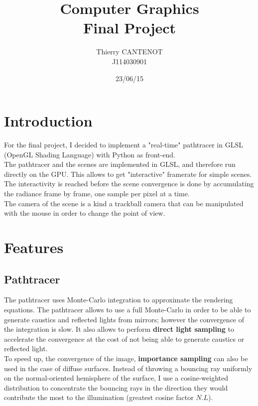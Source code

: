 \documentclass[a4paper,10pt]{article}
\title{\textbf{Computer Graphics} \\ Final Project}
\author{Thierry CANTENOT \\ J114030901}
\date{23/06/15}
\begin{document}
\maketitle


\pagebreak
\section{Introduction}

For the final project, I decided to implement a "real-time" pathtracer in GLSL (OpenGL Shading Language) with Python as front-end. \\
The pathtracer and the scenes are implemented in GLSL, and therefore run directly on the GPU. This allows to get "interactive" framerate for simple scenes. The interactivity is reached before the scene convergence is done by accumulating the radiance frame by frame, one sample per pixel at a time.\\
The camera of the scene is a kind a trackball camera that can be manipulated with the mouse in order to change the point of view.

\section{Features}

\subsection{Pathtracer}


The pathtracer uses Monte-Carlo integration to approximate the rendering equations. The pathtracer allows to use a full Monte-Carlo in order to be able to generate caustics and reflected lights from mirrors; however the convergence of the integration is slow. It also allows to perform \textbf{direct light sampling} to accelerate the convergence at the cost of not being able to generate caustics or reflected light.\\

\noindent
To speed up, the convergence of the image, \textbf{importance sampling} can also be used in the case of diffuse surfaces. Instead of throwing a bouncing ray uniformly on the normal-oriented hemisphere of the surface, I use a cosine-weighted distribution to concentrate the bouncing rays in the direction they would contribute the most to the illumination (greatest cosine factor $N.L$). \\
\end{document}
